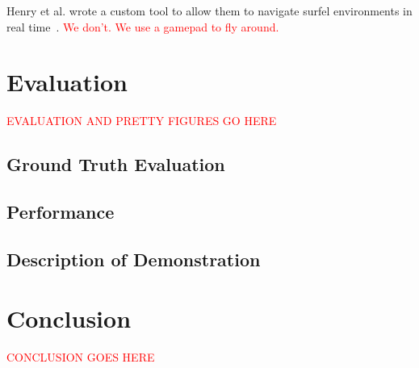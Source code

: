 \documentclass[letterpaper, 10pt, conference]{ieeeconf}
\newcommand{\xxx}[1]{\textcolor{red}{#1}}
\begin{document}
Henry et al. wrote a custom tool to allow them to navigate surfel environments
in real time~\cite{Henry2010rgbd}. \xxx{We don't. We use a gamepad to fly
    around.}

\section{Evaluation}
\xxx{EVALUATION AND PRETTY FIGURES GO HERE}
\subsection{Ground Truth Evaluation}

\subsection{Performance}

\subsection{Description of Demonstration}

\section{Conclusion}
\xxx{CONCLUSION GOES HERE}



\end{document}
